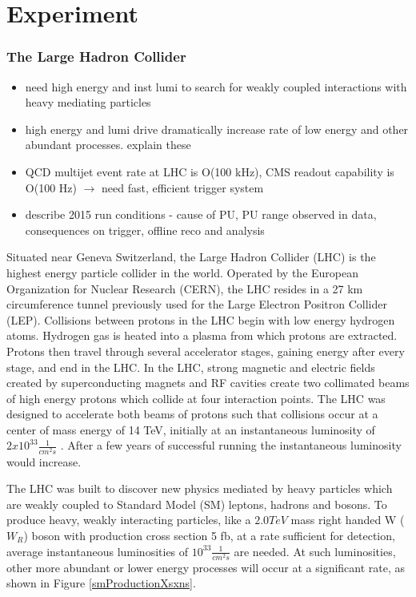 \chapter{Experiment}
\label{experiment_chapter}
\subsection{The Large Hadron Collider}
\begin{itemize}
	\item need high energy and inst lumi to search for weakly coupled interactions with heavy mediating particles
	\item high energy and lumi drive dramatically increase rate of low energy and other abundant processes. explain these
	\item QCD multijet event rate at LHC is O(100 kHz), CMS readout capability is O(100 Hz) $\rightarrow$ need fast, efficient trigger system
	\item describe 2015 run conditions - cause of PU, PU range observed in data, consequences on trigger, offline reco and analysis
\end{itemize}
Situated near Geneva Switzerland, the Large Hadron Collider (LHC) is the highest energy particle
collider in the world.  Operated by the European Organization for Nuclear Research (CERN), the LHC resides in
a 27 km circumference tunnel previously used for the Large Electron Positron Collider (LEP).  Collisions between
protons in the LHC begin with low energy hydrogen atoms.  Hydrogen gas is heated into a plasma from which protons are
extracted.  Protons then travel through several accelerator stages, gaining energy after every stage, and end in
the LHC.  In the LHC, strong magnetic and electric fields created by superconducting magnets and RF cavities 
create two collimated beams of high energy protons which collide at four interaction points.  The LHC was
designed to accelerate both beams of protons such that collisions occur at a center of mass energy of 14 TeV,
initially at an instantaneous luminosity of $2x10^{33} \frac{1}{cm^{2}s}$ \cite{}.  After a few years of successful running
the instantaneous luminosity would increase.

The LHC was built to discover new physics mediated by heavy particles which are weakly coupled to Standard Model (SM)
leptons, hadrons and bosons.  To produce heavy, weakly interacting particles, like a $2.0 TeV$ mass right handed W ($W_{R}$) boson
with production cross section 5 fb, at a rate sufficient for detection, average instantaneous luminosities of
$10^{33} \frac{1}{cm^{2}s}$ are needed.  At such luminosities, other more abundant or lower energy processes will occur
at a significant rate, as shown in Figure \ref{smProductionXsxns}.

